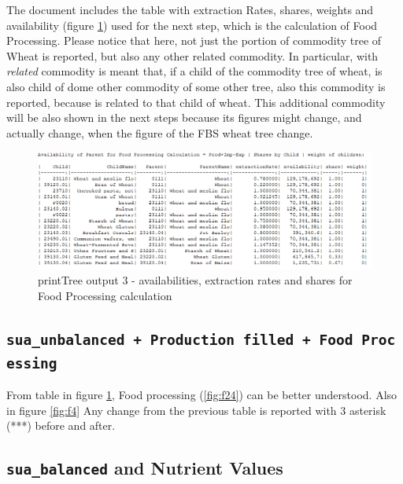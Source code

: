 \documentclass[]{article}
\begin{document}
The document includes the table with extraction Rates, shares, weights
and availability (figure \ref{fig:f3}) used for the next step, which is
the calculation of Food Processing. Please notice that here, not just
the portion of commodity tree of Wheat is reported, but also any other
related commodity. In particular, with \emph{related} commodity is meant
that, if a child of the commodity tree of wheat, is also child of dome
other commodity of some other tree, also this commodity is reported,
because is related to that child of wheat. This additional commodity
will be also shown in the next steps because its figures might change,
and actually change, when the figure of the FBS wheat tree change.

\begin{figure}[H]

{\centering \includegraphics[width=0.9\linewidth]{images/printTree/03_availabilities} 

}

\caption{\label{fig:f3}printTree output 3 - availabilities, extraction rates and shares for Food Processing calculation}\label{fig:f3}
\end{figure}

\subsection{\texorpdfstring{\texttt{sua\_unbalanced\ +\ Production\ filled\ +\ Food\ Processing}}{sua\_unbalanced + Production filled + Food Processing}}\label{sua_unbalanced-production-filled-food-processing}

From table in figure \ref{fig:f3}, Food processing (\ref{fig:f24}) can
be better understood. Also in figure \ref{fig:f4} Any change from the
previous table is reported with 3 asterisk (***) before and after.

\subsection{\texorpdfstring{\texttt{sua\_balanced} and Nutrient
Values}{sua\_balanced and Nutrient Values}}\label{sua_balanced-and-nutrient-values}
\end{document}
